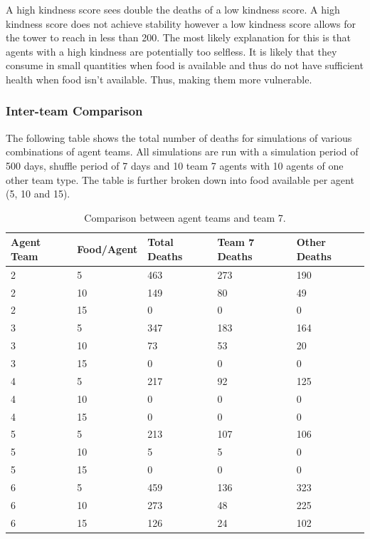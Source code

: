 A high kindness score sees double the deaths of a low kindness score. A high kindness score does not achieve stability however a low kindness score allows for the tower to reach in less than 200. The most likely explanation for this is that agents with a high kindness are potentially too selfless. It is likely that they consume in small quantities when food is available and thus do not have sufficient health when food isn't available. Thus, making them more vulnerable.

\newpage
\subsubsection{Inter-team Comparison}
The following table shows the total number of deaths for simulations of various combinations of agent teams. All simulations are run with a simulation period of 500 days, shuffle period of 7 days and 10 team 7 agents with 10 agents of one other team type. The table is further broken down into food available per agent (5, 10 and 15).
\begin{table}
    \begin{center}
    \begin{tabular} { | m{4em} | m{6em} | m{4em} | m{4em} | m{4em} | }
        \hline
            \textbf{Agent Team} & \textbf{Food/Agent} & \textbf{Total Deaths} & \textbf{Team 7 Deaths} & \textbf{Other Deaths} \\
        \hline
        2 & 5 & 463 & 273 & 190 \\
        \hline
        2 & 10 & 149 & 80 & 49 \\
        \hline
        2 & 15 & 0 & 0 & 0 \\
        \hline
        3 & 5 & 347 & 183 & 164\\
        \hline
        3 & 10 & 73 & 53 & 20\\
        \hline
        3 & 15 & 0 & 0 & 0 \\
        \hline
        4 & 5 & 217 & 92 & 125\\
        \hline
        4 & 10 & 0 & 0 & 0 \\
        \hline
        4 & 15 & 0 & 0 & 0 \\
        \hline
        5 & 5 & 213 & 107 & 106 \\
        \hline
        5 & 10 & 5 & 5 & 0 \\
        \hline
        5 & 15 &  0 & 0 & 0 \\ 
        \hline
        6 & 5 & 459 & 136 & 323\\
        \hline
        6 & 10 & 273 & 48 & 225\\
        \hline
        6 & 15 & 126 & 24 & 102\\
        \hline
    \end{tabular}
    \end{center}
    \caption{Comparison between agent teams and team 7.}
\end{table}
